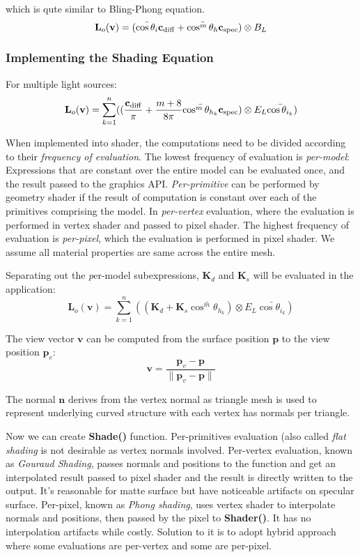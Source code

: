 \documentclass[10pt, a4paper]{article}
\begin{document}
        which is qute similar to Bling-Phong equation.
        $$\textbf{L}_o(\textbf{v}) = (\bar{\cos{\theta_i}}\textbf{c}_{\rm{diff}} + \bar{\cos^m{\theta_h}}\textbf{c}_{\rm{spec}}) \otimes B_L$$
        
        \subsubsection{Implementing the Shading Equation} 
            For multiple light sources: 
            $$\textbf{L}_o(\textbf{v}) = \sum_{k = 1}^n((\frac{\textbf{c}_{\rm{diff}}}{\pi} + \frac{m + 8}{8\pi}\bar{\cos^m{\theta_{h_k}}}\textbf{c}_{\rm{spec}}) \otimes E_L\bar{\cos{\theta_{i_k}}})$$
            
            When implemented into shader, the computations need to be divided according to their \emph{frequency of evaluation}. The lowest frequency of evaluation is \emph{per-model}: Expressions that are constant over the entire model can be evaluated once, and the result passed to the graphics API. \emph{Per-primitive} can be performed by geometry shader if the result of computation is constant over each of the primitives comprising the model. In \emph{per-vertex} evaluation, where the evaluation is performed in vertex shader and passed to pixel shader. The highest frequency of evaluation is \emph{per-pixel}, which the evaluation is performed in pixel shader. We assume all material properties are same across the entire mesh. 

            Separating out the \emph per-model subexpressions, $\textbf{K}_d$ and $\textbf{K}_s$ will be evaluated in the application: 
            $$\textbf{L}_o(\textbf{v}) = \sum_{k = 1}^n((\textbf{K}_d + \textbf{K}_s\bar{\cos^m{\theta_{h_k}}}) \otimes E_L\bar{\cos{\theta_{i_k}}})$$
            
            The view vector $\textbf{v}$ can be computed from the surface position $\textbf{p}$ to the view position $\textbf{p}_v$: 
            $$ \textbf{v} = \frac{\textbf{p}_v - \textbf{p}}{\parallel \textbf{p}_v - \textbf{p} \parallel}$$ 
            
            The normal $\textbf{n}$ derives from the vertex normal as triangle mesh is used to represent underlying curved structure with each vertex has normals per triangle. 
            
            Now we can create \textbf{Shade()} function. Per-primitives evaluation (also called \emph{flat shading} is not desirable as vertex normals involved. Per-vertex evaluation, known as \emph{Gouraud Shading}, passes normals and positions to the function and get an interpolated result passed to pixel shader and the result is directly written to the output. It's reasonable for matte surface but have noticeable artifacts on specular surface. Per-pixel, known as \emph{Phong shading}, uses vertex shader to interpolate normals and positions, then passed by the pixel to \textbf{Shader()}. It has no interpolation artifacts while costly. Solution to it is to adopt hybrid approach where some evaluations are per-vertex and some are per-pixel.
\end{document}
